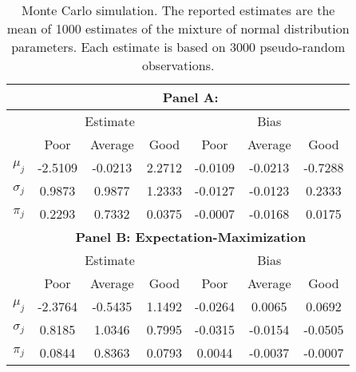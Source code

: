 		\begin{table}[p]
			\centering
			\small
			\begin{tabular}{*{7}{c}}
			    \toprule
			    & \multicolumn{6}{c}{\textbf{Panel A: \citet{Barras2010}}} \\
			    \midrule
			    & \multicolumn{3}{c}{Estimate} & \multicolumn{3}{c}{Bias} \\
			    \cmidrule(l{2pt}r{2pt}){2-4} \cmidrule(l{2pt}r{2pt}){5-7}
			    & Poor & Average & Good & Poor & Average & Good \\
			    \midrule
			    $\mu_j$ & -2.5109 & -0.0213 & 2.2712 & -0.0109 & -0.0213 & -0.7288 \\
			    $\sigma_j$ & 0.9873 & 0.9877 & 1.2333 & -0.0127 & -0.0123 & 0.2333 \\
			    $\pi_j$ & 0.2293 & 0.7332 & 0.0375 & -0.0007 & -0.0168 & 0.0175 \\
			    \midrule
			    & \multicolumn{6}{c}{\textbf{Panel B: Expectation-Maximization}} \\
			    \midrule
			    & \multicolumn{3}{c}{Estimate} & \multicolumn{3}{c}{Bias} \\
			    \cmidrule(l{2pt}r{2pt}){2-4} \cmidrule(l{2pt}r{2pt}){5-7}
			    & Poor & Average & Good & Poor & Average & Good \\
			    \midrule
			    $\mu_j$ & -2.3764 & -0.5435 & 1.1492 & -0.0264 & 0.0065 & 0.0692 \\
			    $\sigma_j$ & 0.8185 & 1.0346 & 0.7995 & -0.0315 & -0.0154 & -0.0505 \\
			    $\pi_j$ & 0.0844 & 0.8363 & 0.0793 & 0.0044 & -0.0037 & -0.0007 \\
			    \bottomrule
			    \end{tabular}
			\captionsetup{position=below, font=footnotesize, justification=justified, width=0.71\linewidth}
			\caption[Monte Carlo simulation]{Monte Carlo simulation. The reported estimates are the mean of 1000 estimates of the mixture of normal distribution parameters.  Each estimate is based on 3000 pseudo-random observations.}
			\label{tab:simulation}
		\end{table}


